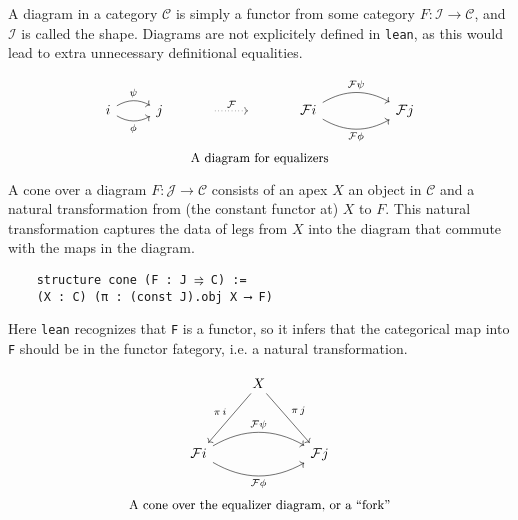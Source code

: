\documentclass{article}
\newcommand{\CC}{\mathcal{C}}
\newcommand{\II}{\mathcal{I}}
\newcommand{\JJ}{\mathcal{J}}
\newcommand{\<}{\langle}
\renewcommand{\>}{\rangle}
\theoremstyle{definitionstyle}
\theoremstyle{exercisestyle}
\theoremstyle{remarkstyle}
\begin{document}
\begin{dfn}
  A diagram in a category $\CC$ is simply a functor from some category
  $F : \II \to \CC$, and $\II$ is called the shape.
  Diagrams are not explicitely defined in \texttt{lean},
  as this would lead to extra unnecessary definitional equalities.

  \[\begin{tikzcd}
  	i & j & {} & {} & {\mathcal{F} i} && {\mathcal{F} j}
  	\arrow["{\mathcal{F} \phi}"', bend right={30}, from=1-5, to=1-7]
  	\arrow["{\mathcal{F} \psi}", bend right={-30}, from=1-5, to=1-7]
  	\arrow["\phi"', bend right={30}, from=1-1, to=1-2]
  	\arrow["\psi", bend right={-30}, from=1-1, to=1-2]
  	\arrow["{\mathcal{F}}", dotted, from=1-3, to=1-4]
  \end{tikzcd}\]
  \[ \text{\small A diagram for equalizers}\]

  A cone over a diagram $F : \JJ \to \CC$ consists of an apex $X$ an object in $\CC$
  and a natural transformation from (the constant functor at) $X$ to $F$.
  This natural transformation captures the data of legs from $X$ into the diagram
  that commute with the maps in the diagram.

  \begin{lstlisting}
    structure cone (F : J ⥤ C) :=
    (X : C) (π : (const J).obj X ⟶ F) \end{lstlisting}

  Here \texttt{lean} recognizes that \texttt{F} is a functor,
  so it infers that the categorical map into \texttt{F} should be
  in the functor fategory, i.e. a natural transformation.

    \[\begin{tikzcd}
  	& X \\
  	\\
  	{\mathcal{F} i} && {\mathcal{F} j}
  	\arrow["{\mathcal{F} \phi}"', bend right={30}, from=3-1, to=3-3]
  	\arrow["{\mathcal{F} \psi}", bend right={-30}, from=3-1, to=3-3]
  	\arrow["{\pi \, i}"', from=1-2, to=3-1]
  	\arrow["{\pi \, j}", from=1-2, to=3-3]
  \end{tikzcd}\]
  \[ \text{\small A cone over the equalizer diagram, or a ``fork''}\]


\end{dfn}
\end{document}
